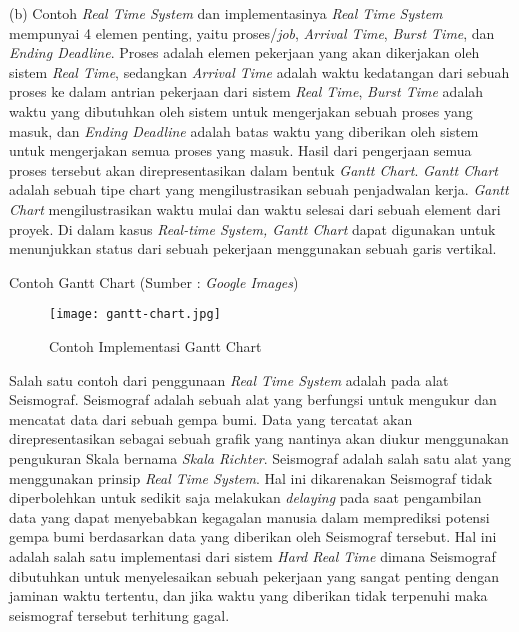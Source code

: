 \documentclass[a4paper,twoside]{article}
\begin{document}
\begin{enumerate}
		(b) Contoh {\it Real Time System} dan implementasinya \newline
		{\it Real Time System} mempunyai 4 elemen penting, yaitu proses/{\it job}, {\it Arrival Time}, {\it Burst Time}, dan {\it Ending Deadline}. Proses adalah elemen pekerjaan yang akan dikerjakan oleh sistem {\it Real Time}, sedangkan {\it Arrival Time} adalah waktu kedatangan dari sebuah proses ke dalam antrian pekerjaan dari sistem {\it Real Time}, {\it Burst Time} adalah waktu yang dibutuhkan oleh sistem untuk mengerjakan sebuah proses yang masuk, dan {\it Ending Deadline} adalah batas waktu yang diberikan oleh sistem untuk mengerjakan semua proses yang masuk.\newline
		Hasil dari pengerjaan semua proses tersebut akan direpresentasikan dalam bentuk {\it Gantt Chart}. {\it Gantt Chart} adalah sebuah tipe chart yang mengilustrasikan sebuah penjadwalan kerja. {\it Gantt Chart} mengilustrasikan waktu mulai dan waktu selesai dari sebuah element dari proyek. Di dalam kasus {\it Real-time System, Gantt Chart} dapat digunakan untuk menunjukkan status dari sebuah pekerjaan menggunakan sebuah garis vertikal. \newline
		\begin{center}
		
        Contoh Gantt Chart (Sumber : {\it Google Images})
        \begin{figure}
            \centering
            \texttt{[image: gantt-chart.jpg]}
            \caption{Contoh Implementasi Gantt Chart}
            \label{Gantt Chart}
        \end{figure}
		\end{center}
		Salah satu contoh dari penggunaan {\it Real Time System} adalah pada alat Seismograf. Seismograf adalah sebuah alat yang berfungsi untuk mengukur dan mencatat data dari sebuah gempa bumi. Data yang tercatat akan direpresentasikan sebagai sebuah grafik yang nantinya akan diukur menggunakan pengukuran Skala bernama {\it Skala Richter}. Seismograf adalah salah satu alat yang menggunakan prinsip {\it Real Time System}. Hal ini dikarenakan Seismograf tidak diperbolehkan untuk sedikit saja melakukan {\it delaying} pada saat pengambilan data yang dapat menyebabkan kegagalan manusia dalam memprediksi potensi gempa bumi berdasarkan data yang diberikan oleh Seismograf tersebut. Hal ini adalah salah satu implementasi dari sistem {\it Hard Real Time} dimana Seismograf dibutuhkan untuk menyelesaikan sebuah pekerjaan yang sangat penting dengan jaminan waktu tertentu, dan jika waktu yang diberikan tidak terpenuhi maka seismograf tersebut terhitung gagal. \newpage
		

\end{enumerate}
\end{document}
